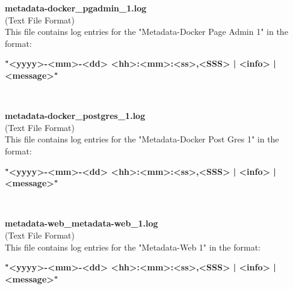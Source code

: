 \begin{description}
\begin{addmargin}[0em]{0em}
    \label{metadata-docker_pgadmin_1.log}
    \begin{addmargin}[1em]{0em} %
        \textbf{metadata-docker\_pgadmin\_1.log}\\
        (Text File Format)\\
        This file contains log entries for the "Metadata-Docker Page Admin 1" in the format:
        \begin{addmargin}[1em]{0em}
            \textbf{"<yyyy>-<mm>-<dd> <hh>:<mm>:<ss>,<SSS> | <info> | <message>"}
        \end{addmargin}
    \end{addmargin} %
    \textbf{\\}

    \label{metadata-docker_postgres_1.log}
    \begin{addmargin}[1em]{0em} %
        \textbf{metadata-docker\_postgres\_1.log}\\
        (Text File Format)\\
        This file contains log entries for the "Metadata-Docker Post Gres 1" in the format:
        \begin{addmargin}[1em]{0em}
            \textbf{"<yyyy>-<mm>-<dd> <hh>:<mm>:<ss>,<SSS> | <info> | <message>"}
        \end{addmargin}
    \end{addmargin} %
    \textbf{\\}

    \label{metadata-web_metadata-web_1.log}
    \begin{addmargin}[1em]{0em} %
        \textbf{metadata-web\_metadata-web\_1.log}\\
        (Text File Format)\\
        This file contains log entries for the "Metadata-Web 1" in the format:
        \begin{addmargin}[1em]{0em}
            \textbf{"<yyyy>-<mm>-<dd> <hh>:<mm>:<ss>,<SSS> | <info> | <message>"}
        \end{addmargin}
    \end{addmargin} %
    \textbf{\\}


\end{addmargin}
\end{description}

